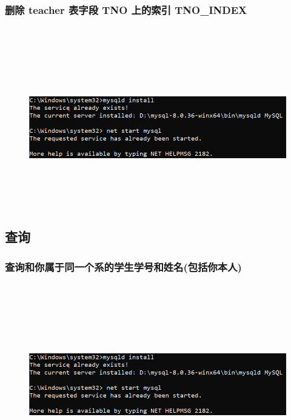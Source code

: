 \documentclass{ctexart}
\begin{document}
\subsubsection{删除 teacher 表字段 TNO 上的索引 TNO\_INDEX}
\begin{lstlisting}[language=sql]
	
\end{lstlisting}
\begin{figure}[H]
	\centering 
	\includegraphics[height=7cm,width=14cm]{1.png}
	\end{figure}
\subsection{查询}
\subsubsection{查询和你属于同一个系的学生学号和姓名(包括你本人)}
\begin{lstlisting}[language=sql]
	
\end{lstlisting}
\begin{figure}[H]
	\centering 
	\includegraphics[height=7cm,width=14cm]{1.png}
	\end{figure}
\end{document}

